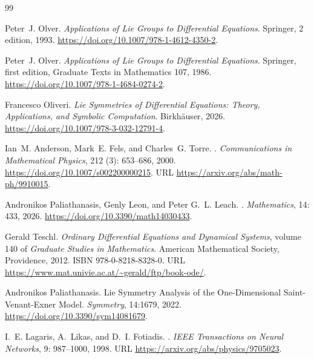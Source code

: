 \documentclass[11pt,a4paper,oneside]{report}
\numberwithin{equation}{chapter}
\begin{document}
\clearpage
{}
\begingroup\small\singlespacing
\setlength{\bibsep}{3pt plus 1pt minus 1pt}
\begin{thebibliography}{99}
\providecommand{\natexlab}[1]{#1}
\newcommand{\doi}[1]{\url{https://doi.org/#1}}

Peter~J. Olver.
\newblock \emph{{Applications of Lie Groups to Differential Equations}}.
\newblock Springer, 2 edition, 1993.
\newblock \doi{10.1007/978-1-4612-4350-2}.

Peter~J. Olver.
\newblock \emph{Applications of Lie Groups to Differential Equations}.
\newblock Springer, first edition, Graduate Texts in Mathematics 107, 1986.
\newblock \doi{10.1007/978-1-4684-0274-2}.


Francesco Oliveri.
\newblock \emph{{Lie Symmetries of Differential Equations: Theory,
  Applications, and Symbolic Computation}}.
\newblock Birkh{\"a}user, 2026.
\newblock \doi{10.1007/978-3-032-12791-4}.

Ian~M. Anderson, Mark~E. Fels, and Charles~G. Torre.
.
\newblock \emph{Communications in Mathematical Physics}, 212
  (3): 653--686, 2000.
\newblock \doi{10.1007/s002200000215}.
\newblock URL \url{https://arxiv.org/abs/math-ph/9910015}.

Andronikos Paliathanasis, Genly Leon, and Peter G.~L. Leach.
.
\newblock \emph{Mathematics}, 14: 433, 2026.
\newblock \doi{10.3390/math14030433}.

Gerald Teschl.
\newblock \emph{Ordinary Differential Equations and Dynamical Systems}, volume
  140 of \emph{Graduate Studies in Mathematics}.
\newblock American Mathematical Society, Providence, 2012.
\newblock ISBN 978-0-8218-8328-0.
\newblock URL \url{https://www.mat.univie.ac.at/~gerald/ftp/book-ode/}.

Andronikos Paliathanasis.
\newblock Lie Symmetry Analysis of the One-Dimensional Saint-Venant-Exner Model.
\newblock \emph{Symmetry}, 14:1679, 2022.
\newblock \doi{10.3390/sym14081679}.

I.~E. Lagaris, A.~Likas, and D.~I. Fotiadis.
.
\newblock \emph{IEEE Transactions on Neural Networks}, 9: 987--1000,
  1998.
\newblock URL \url{https://arxiv.org/abs/physics/9705023}.


\end{thebibliography}
\end{document}
